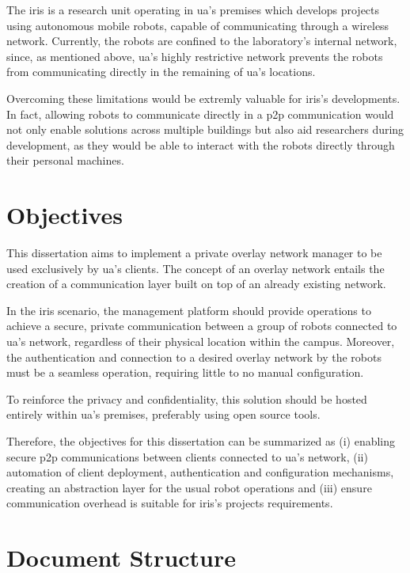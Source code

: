 \documentclass[11pt,twoside,a4paper]{report}
\begin{document}
The \ac{iris} is a research unit operating in \ac{ua}'s premises which develops projects using autonomous mobile robots, capable of communicating through a wireless network. Currently, the robots are confined to the laboratory's internal network, since, as mentioned above, \ac{ua}'s highly restrictive network prevents the robots from communicating directly in the remaining of \ac{ua}'s locations.

Overcoming these limitations would be extremly valuable for \ac{iris}'s developments. In fact, allowing robots to communicate directly in a \ac{p2p} communication would not only enable solutions across multiple buildings but also aid researchers during development, as they would be able to interact with the robots directly through their personal machines.

\section{Objectives}

This dissertation aims to implement a private overlay network manager to be used exclusively by \ac{ua}'s clients. The concept of an overlay network entails the creation of a communication layer built on top of an already existing network.

In the \ac{iris} scenario, the management platform should provide operations to achieve a secure, private communication between a group of robots connected to \ac{ua}'s network, regardless of their physical location within the campus. Moreover, the authentication and connection to a desired overlay network by the robots must be a seamless operation, requiring little to no manual configuration.

To reinforce the privacy and confidentiality, this solution should be hosted entirely within \ac{ua}'s premises, preferably using open source tools.

Therefore, the objectives for this dissertation can be summarized as (i) enabling secure \ac{p2p} communications between clients connected to \ac{ua}'s network, (ii) automation of client deployment, authentication and configuration mechanisms, creating an abstraction layer for the usual robot operations and (iii) ensure communication overhead is suitable for \ac{iris}'s projects requirements.

\section{Document Structure}
\end{document}
